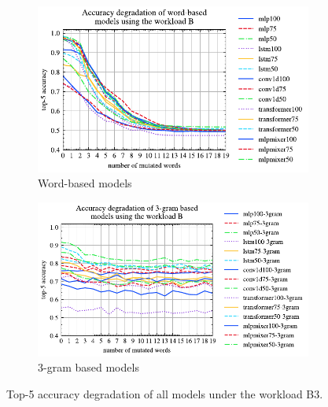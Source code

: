 \begin{figure}[!th]
	\centering
	\begin{subfigure}[]{0.95\textwidth}
		\includegraphics[]{my/graphics/acc_degradation_word_based_B.pdf}
		\caption{Word-based models}
		\label{fig:acc_degradation_workload_B_word_based}
	\end{subfigure}
	\vfill
	\begin{subfigure}[]{0.95\textwidth}
		\includegraphics[]{my/graphics/acc_degradation_3gram_based_B.pdf}
		\caption{3-gram based models}
		\label{fig:acc_degradation_workload_B_3gram}
	\end{subfigure}
	\caption{Top-5 accuracy degradation of all models under the workload B3.}
	\label{fig:acc_degradation_workload_B_all}
\end{figure}

